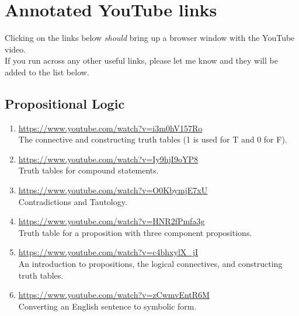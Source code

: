 \documentclass[11pt]{amsart}
\begin{document}
\section{Annotated YouTube links}

Clicking on the links below {\it should} bring up a browser window with the YouTube video.\\[5pt]
If you run across any other useful links, please let me know and they will be added to the list below.




\subsection{Propositional Logic}



\begin{enumerate}

\item \url{https://www.youtube.com/watch?v=i3m0hV157Ro}\\
The connective and constructing truth tables (1 is used for T and 0 for F).\\[5pt]

\item \url{https://www.youtube.com/watch?v=Iy9hjI9oYP8}\\
Truth tables for compound statements.\\[5pt]

\item \url{https://www.youtube.com/watch?v=O0KbymjE7xU}\\
Contradictions and Tautology.\\[5pt]

\item \url{https://www.youtube.com/watch?v=HNR2fPmfa3g}\\
Truth table for a proposition with three component propositions.\\[5pt]

\item \url{https://www.youtube.com/watch?v=c4bhxylX_jI}\\
An introduction to propositions, the logical connectives, and constructing truth tables. \\[5pt]

\item \url{https://www.youtube.com/watch?v=zCwmvEntR6M}\\
Converting an English sentence to symbolic form.\\[5pt]


\end{enumerate}
\end{document}
